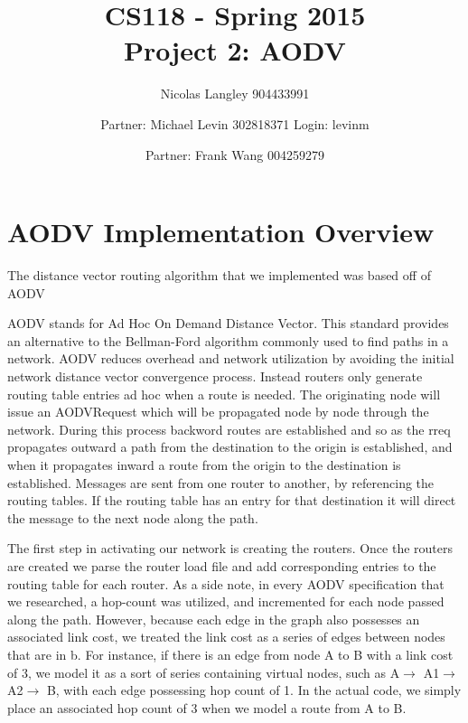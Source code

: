 \documentclass[12pt, titlepage]{article}
\begin{document}
\title{CS118 - Spring 2015 \\
Project 2: AODV}
\author{Nicolas Langley 904433991 \and Partner: Michael Levin 302818371 Login: levinm \and Partner: Frank Wang 004259279}

\maketitle
\section{AODV Implementation Overview}

The distance vector routing algorithm that we implemented was based off of AODV

AODV stands for Ad Hoc On Demand Distance Vector.
This standard provides an alternative to the Bellman-Ford algorithm commonly used to find paths in a network.
AODV reduces overhead and network utilization by avoiding the initial network distance vector convergence process.
Instead routers only generate routing table entries ad hoc when a route is needed.  The originating node will issue an AODVRequest which will be propagated node by node through the network. During this process backword routes are established and so as the rreq propagates outward a path from the destination to the origin is established, and when it propagates inward a route from the origin to the destination is established.  Messages are sent from one router to another, by referencing the routing tables.  If the routing table has an entry for that destination it will direct the message to the next node along the path.

The first step in activating our network is creating the routers. Once the routers are created we parse the router load file and add corresponding entries to the routing table for each router. As a side note, in every AODV 
specification that we researched, a hop-count was utilized, and incremented for each node passed along the path. However, because each edge in the graph also possesses an associated link cost, we treated the link cost as a series of edges between nodes that are in b. For instance, if there is an edge from node A to B with a link cost of 3, we model it as a sort of series containing virtual nodes, such as A$\rightarrow$ A1$\rightarrow$ A2$\rightarrow$ B, with each edge possessing hop count of 1. In the actual code, we simply place an associated hop count of 3 when we model a route from A to B. 
\end{document}
